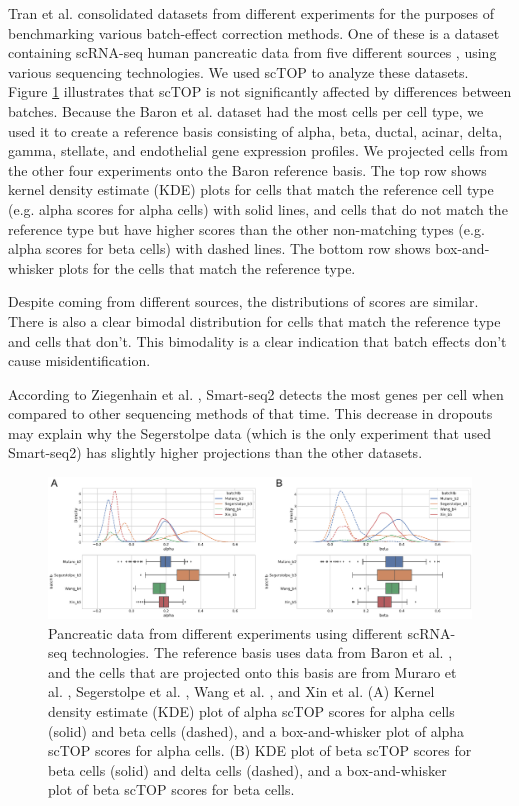 \documentclass[aps,superscriptaddress, notitlepage,longbibliography]{revtex4-1}
\begin{document}
Tran et al. \cite{tran2020benchmark} consolidated datasets from different experiments for the purposes of benchmarking various batch-effect correction methods. One of these is a dataset containing scRNA-seq human pancreatic data from five different sources \cite{baron2016single} \cite{muraro2016single} \cite{segerstolpe2016single} \cite{wang2016single} \cite{xin2016rna}, using various sequencing technologies. We used scTOP to analyze these datasets. Figure \ref{batch effects} illustrates that scTOP is not significantly affected by differences between batches. Because the Baron et al. dataset had the most cells per cell type, we used it to create a reference basis consisting of alpha, beta, ductal, acinar, delta, gamma, stellate, and endothelial gene expression profiles. We projected cells from the other four experiments onto the Baron reference basis. The top row shows kernel density estimate (KDE) plots for cells that match the reference cell type (e.g. alpha scores for alpha cells) with solid lines, and cells that do not match the reference type but have higher scores than the other non-matching types (e.g. alpha scores for beta cells) with dashed lines. The bottom row shows box-and-whisker plots for the cells that match the reference type.

Despite coming from different sources, the distributions of scores are similar. There is also a clear bimodal distribution for cells that match the reference type and cells that don't. This bimodality is a clear indication that batch effects don't cause misidentification.

According to Ziegenhain et al. \cite{ziegenhain2017comparative}, Smart-seq2 detects the most genes per cell when compared to other sequencing methods of that time. This decrease in dropouts may explain why the Segerstolpe data (which is the only experiment that used Smart-seq2) has slightly higher projections than the other datasets.

\begin{figure}
	\centering
    \includegraphics[scale=0.95]{figs/batch effects.pdf}
	\caption{Pancreatic data from different experiments using different scRNA-seq technologies. The reference basis uses data from Baron et al. \cite{baron2016single}, and the cells that are projected onto this basis are from Muraro et al. \cite{muraro2016single}, Segerstolpe et al. \cite{segerstolpe2016single}, Wang et al. \cite{wang2016single}, and Xin et al. \cite{xin2016rna} (A) Kernel density estimate (KDE) plot of alpha scTOP scores for alpha cells (solid) and beta cells (dashed), and a box-and-whisker plot of alpha scTOP scores for alpha cells. (B) KDE plot of beta scTOP scores for beta cells (solid) and delta cells (dashed), and a box-and-whisker plot of beta scTOP scores for beta cells. }
	\label{batch effects}
\end{figure}
\end{document}
